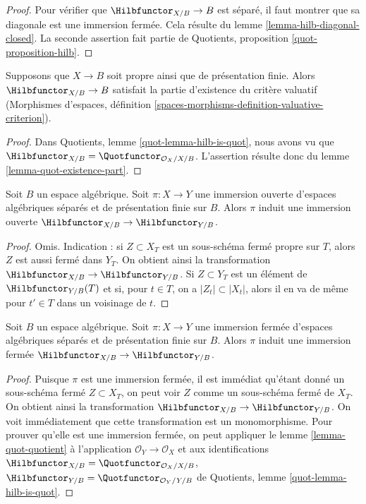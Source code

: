 \begin{proof}
Pour vérifier que $\Hilbfunctor_{X/B} \to B$ est séparé, il faut montrer
que sa diagonale est une immersion fermée. Cela résulte du lemme
\ref{lemma-hilb-diagonal-closed}. La seconde assertion fait partie de
Quotients, proposition \ref{quot-proposition-hilb}.
\end{proof}

\begin{lemma}
\label{lemma-hilb-existence-part}
Supposons que $X \to B$ soit propre ainsi que de présentation finie.
Alors $\Hilbfunctor_{X/B} \to B$ satisfait la partie d'existence du critère
valuatif (Morphismes d'espaces, définition
\ref{spaces-morphisms-definition-valuative-criterion}).
\end{lemma}

\begin{proof}
Dans Quotients, lemme \ref{quot-lemma-hilb-is-quot}, nous avons vu que
$\Hilbfunctor_{X/B} = \Quotfunctor_{\mathcal{O}_X/X/B}$.
L'assertion résulte donc du lemme \ref{lemma-quot-existence-part}.
\end{proof}

\begin{lemma}
\label{lemma-hilb-open}
Soit $B$ un espace algébrique. Soit $\pi : X \to Y$ une immersion ouverte
d'espaces algébriques séparés et de présentation finie sur $B$.
Alors $\pi$ induit une immersion ouverte
$\Hilbfunctor_{X/B} \to \Hilbfunctor_{Y/B}$.
\end{lemma}

\begin{proof}
Omis. Indication : si $Z \subset X_T$ est un sous-schéma fermé propre sur
$T$, alors $Z$ est aussi fermé dans $Y_T$. On obtient ainsi la
transformation $\Hilbfunctor_{X/B} \to \Hilbfunctor_{Y/B}$.
Si $Z \subset Y_T$ est un élément de $\Hilbfunctor_{Y/B}(T)$ et si, pour
$t \in T$, on a $|Z_t| \subset |X_t|$, alors il en va de même pour
$t' \in T$ dans un voisinage de $t$.
\end{proof}

\begin{lemma}
\label{lemma-hilb-closed}
Soit $B$ un espace algébrique. Soit $\pi : X \to Y$ une immersion fermée
d'espaces algébriques séparés et de présentation finie sur $B$.
Alors $\pi$ induit une immersion fermée
$\Hilbfunctor_{X/B} \to \Hilbfunctor_{Y/B}$.
\end{lemma}

\begin{proof}
Puisque $\pi$ est une immersion fermée, il est immédiat qu'étant donné un
sous-schéma fermé $Z \subset X_T$, on peut voir $Z$ comme un sous-schéma
fermé de $X_T$. On obtient ainsi la transformation
$\Hilbfunctor_{X/B} \to \Hilbfunctor_{Y/B}$.
On voit immédiatement que cette transformation est un monomorphisme.
Pour prouver qu'elle est une immersion fermée, on peut appliquer le lemme
\ref{lemma-quot-quotient} à l'application
$\mathcal{O}_Y \to \mathcal{O}_X$ et aux identifications
$\Hilbfunctor_{X/B} = \Quotfunctor_{\mathcal{O}_X/X/B}$,
$\Hilbfunctor_{Y/B} = \Quotfunctor_{\mathcal{O}_Y/Y/B}$
de Quotients, lemme \ref{quot-lemma-hilb-is-quot}.
\end{proof}

